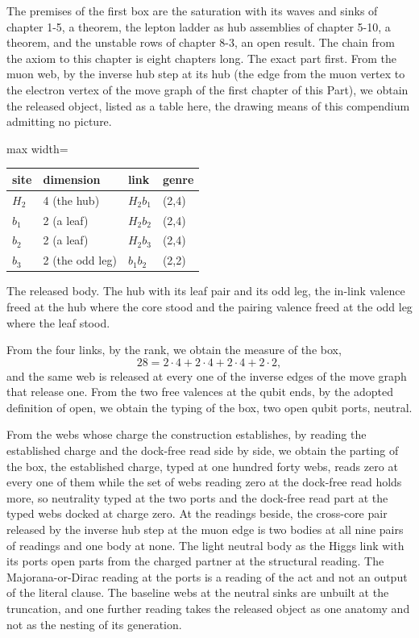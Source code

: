 \begin{chproof}[exact]
The premises of the first box are the saturation with its waves and sinks of chapter 1-5, a theorem, the lepton ladder as hub assemblies of chapter 5-10, a theorem, and the unstable rows of chapter 8-3, an open result. The chain from the axiom to this chapter is eight chapters long. The exact part first. From the muon web, by the inverse hub step at its hub (the edge from the muon vertex to the electron vertex of the move graph of the first chapter of this Part), we obtain the released object, listed as a table here, the drawing means of this compendium admitting no picture.
\begin{center}\small
\begin{adjustbox}{max width=\linewidth}\begin{tabular}{llll}
\hline
site & dimension & link & genre \\
\hline
$H_2$ & 4 (the hub) & $H_2 b_1$ & (2,4) \\
$b_1$ & 2 (a leaf) & $H_2 b_2$ & (2,4) \\
$b_2$ & 2 (a leaf) & $H_2 b_3$ & (2,4) \\
$b_3$ & 2 (the odd leg) & $b_1 b_2$ & (2,2) \\
\hline
\end{tabular}\end{adjustbox}

The released body. The hub with its leaf pair and its odd leg, the in-link valence freed at the hub where the core stood and the pairing valence freed at the odd leg where the leaf stood.
\end{center}
From the four links, by the rank, we obtain the measure of the box,
\begin{equation}
28 = 2 \cdot 4 + 2 \cdot 4 + 2 \cdot 4 + 2 \cdot 2 ,
\end{equation}
and the same web is released at every one of the inverse edges of the move graph that release one. From the two free valences at the qubit ends, by the adopted definition of open, we obtain the typing of the box, two open qubit ports, neutral.

From the webs whose charge the construction establishes, by reading the established charge and the dock-free read side by side, we obtain the parting of the box, the established charge, typed at one hundred forty webs, reads zero at every one of them while the set of webs reading zero at the dock-free read holds more, so neutrality typed at the two ports and the dock-free read part at the typed webs docked at charge zero. At the readings beside, the cross-core pair released by the inverse hub step at the muon edge is two bodies at all nine pairs of readings and one body at none. The light neutral body as the Higgs link with its ports open parts from the charged partner at the structural reading. The Majorana-or-Dirac reading at the ports is a reading of the act and not an output of the literal clause. The baseline webs at the neutral sinks are unbuilt at the truncation, and one further reading takes the released object as one anatomy and not as the nesting of its generation.


\end{chproof}
